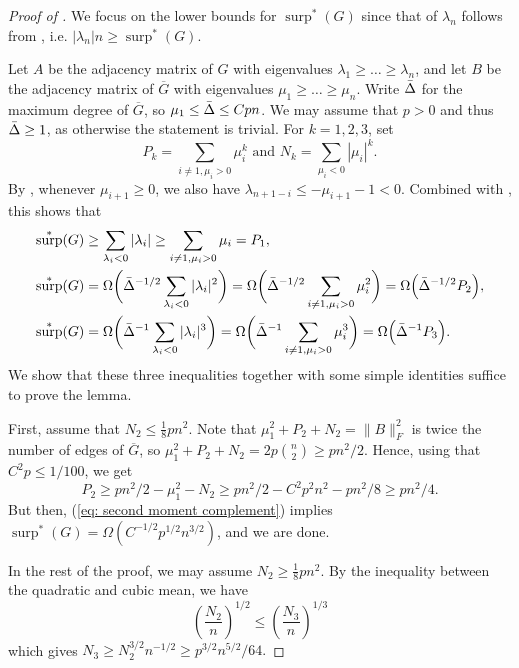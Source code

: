 \documentclass[11pt]{article}
\theoremstyle{plain}
\theoremstyle{definition}
\DeclareMathOperator{\surp}{surp}
\begin{document}
\begin{proof}[Proof of ]
    We focus on the lower bounds for $\surp^*(G)$ since that of $\lambda_n$ follows from , i.e. $|\lambda_n|n \ge \surp^*(G)$.
    
    Let $A$ be the adjacency matrix of $G$ with eigenvalues $\lambda_1\geq \dots\geq \lambda_n$, and let $B$ be the adjacency matrix of $\overline{G}$ with eigenvalues $\mu_1\geq\dots\geq \mu_n$.
    Write $\Bar{\Delta}$ for the maximum degree of $\overline{G}$, so $\mu_1\leq \Bar{\Delta}\leq Cpn$. We may assume that $p>0$ and thus $\Bar{\Delta}\geq 1$, as otherwise the statement is trivial. For $k=1,2,3$, set $$P_k=\sum_{i\neq 1, \mu_i>0}\mu_i^k\mbox{\ \ \ and\ \ \ } N_k=\sum_{\mu_i<0}|\mu_i|^k.$$ 
    By , whenever $\mu_{i+1}\geq 0$, we also have $\lambda_{n+1-i}\leq -\mu_{i+1}-1<0$. 
    Combined with , this shows that
    \begin{align} 
        \surp^*(G) 
            &\geq \sum_{\lambda_i<0}|\lambda_i| 
            \geq \sum_{i\neq 1, \mu_i>0}\mu_i = P_1, \label{eq: first moment complement}\\
        \surp^*(G) 
            &= \Omega\bigg(\Bar{\Delta}^{-1/2}\sum_{\lambda_i<0}|\lambda_i|^2\bigg)
            =\Omega\bigg({\Bar{\Delta}^{-1/2}}\sum_{i\neq 1, \mu_i>0}\mu_i^2\bigg) 
            = \Omega\Big(\Bar{\Delta}^{-1/2}P_2\Big), \label{eq: second moment complement}\\
        \surp^*(G) &
            = \Omega\bigg(\Bar{\Delta}^{-1}\sum_{\lambda_i<0}|\lambda_i|^3\bigg)
            = \Omega\bigg(\Bar{\Delta}^{-1}\sum_{i \neq 1, \mu_i>0}\mu_i^3\bigg)
            = \Omega\Big(\Bar{\Delta}^{-1}P_3\Big). \label{eq: third moment complement}
    \end{align}
    We show that these three inequalities together with some simple identities suffice to prove the lemma. 
    
    First, assume that $N_2\leq \frac{1}{8}pn^2$. 
    Note that $\mu_1^2+P_2+N_2=\|B\|_F^2$ is twice the number of edges of $\overline{G}$, so $\mu_1^2+P_2+N_2=2p\binom{n}{2}\ge pn^2/2$.
    Hence, using that $C^2p\le 1/100$, we get $$P_2\geq pn^2/2-\mu_1^2-N_2\geq pn^2/2-C^2p^2n^2-pn^2/8\geq pn^2/4.$$
    But then, (\ref{eq: second moment complement}) implies $\surp^*(G)=\Omega(C^{-1/2}p^{1/2}n^{3/2})$, and we are done.
    
    In the rest of the proof, we may assume $N_2\geq \frac{1}{8}pn^2$. 
    By the inequality between the quadratic and cubic mean, we have
    $$\left(\frac{N_2}{n}\right)^{1/2}\leq \left(\frac{N_3}{n}\right)^{1/3}$$
    which gives $N_3\geq N_2^{3/2}n^{-1/2}\geq p^{3/2}n^{5/2}/64.$
    

\end{proof}
\end{document}
